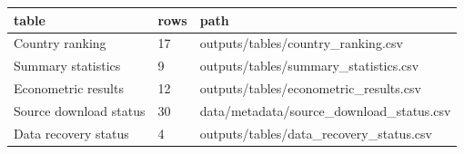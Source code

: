 ﻿%
\begin{tabular}{lll}
\hline
table & rows & path \\
\hline
Country ranking & 17 & outputs/tables/country\_ranking.csv \\
Summary statistics & 9 & outputs/tables/summary\_statistics.csv \\
Econometric results & 12 & outputs/tables/econometric\_results.csv \\
Source download status & 30 & data/metadata/source\_download\_status.csv \\
Data recovery status & 4 & outputs/tables/data\_recovery\_status.csv \\
\hline
\end{tabular}

